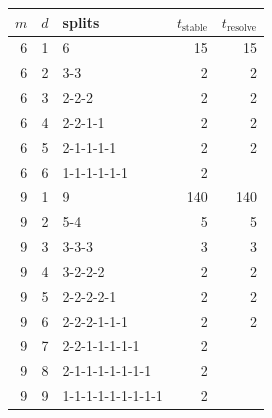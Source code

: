 \begin{tabular}{rrlrr}%
\hline%
$m$&$d$&splits&$t_{\mathrm{stable}}$&$t_{\mathrm{resolve}}$\\%
\hline%
6&1&6&15&15\\%
6&2&3-3&2&2\\%
6&3&2-2-2&2&2\\%
6&4&2-2-1-1&2&2\\%
6&5&2-1-1-1-1&2&2\\%
6&6&1-1-1-1-1-1&2&\\%
9&1&9&140&140\\%
9&2&5-4&5&5\\%
9&3&3-3-3&3&3\\%
9&4&3-2-2-2&2&2\\%
9&5&2-2-2-2-1&2&2\\%
9&6&2-2-2-1-1-1&2&2\\%
9&7&2-2-1-1-1-1-1&2&\\%
9&8&2-1-1-1-1-1-1-1&2&\\%
9&9&1-1-1-1-1-1-1-1-1&2&\\%
\hline%
\end{tabular}
